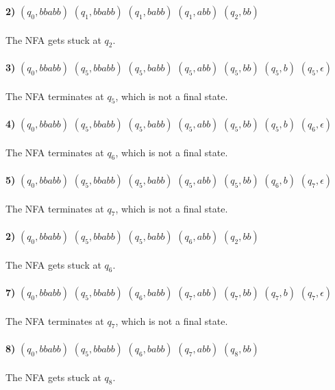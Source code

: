 \documentclass[11pt]{article}
\begin{document}
\textbf{2)} $(q_0,bbabb) $ \vdash $ (q_1,bbabb) $ \vdash $ (q_1,babb) $ \vdash $ (q_1,abb) $ \vdash $ (q_2,bb)$ \\ \\
\indent The NFA gets stuck at $q_2$. \\ \\

\textbf{3)} $(q_0,bbabb) $ \vdash $ (q_5,bbabb) $ \vdash $ (q_5,babb) $ \vdash $ (q_5,abb) $ \vdash $ (q_5,bb) $ \vdash $ (q_5,b) $ \vdash $ (q_5,\epsilon)$ \\ \\
\indent The NFA terminates at $q_5$, which is not a final state. \\ \\

\textbf{4)} $(q_0,bbabb) $ \vdash $ (q_5,bbabb) $ \vdash $ (q_5,babb) $ \vdash $ (q_5,abb) $ \vdash $ (q_5,bb) $ \vdash $ (q_5,b) $ \vdash $ (q_6,\epsilon)$ \\ \\
\indent The NFA terminates at $q_6$, which is not a final state. \\ \\

\textbf{5)} $(q_0,bbabb) $ \vdash $ (q_5,bbabb) $ \vdash $ (q_5,babb) $ \vdash $ (q_5,abb) $ \vdash $ (q_5,bb) $ \vdash $ (q_6,b) $ \vdash $ (q_7,\epsilon)$ \\ \\
\indent The NFA terminates at $q_7$, which is not a final state. \\ \\

\textbf{2)} $(q_0,bbabb) $ \vdash $ (q_5,bbabb) $ \vdash $ (q_5,babb) $ \vdash $ (q_6,abb) $ \vdash $ (q_2,bb)$ \\ \\
\indent The NFA gets stuck at $q_6$. \\ \\

\textbf{7)} $(q_0,bbabb) $ \vdash $ (q_5,bbabb) $ \vdash $ (q_6,babb) $ \vdash $ (q_7,abb) $ \vdash $ (q_7,bb) $ \vdash $ (q_7,b) $ \vdash $ (q_7,\epsilon)$ \\ \\
\indent The NFA terminates at $q_7$, which is not a final state. \\ \\

\textbf{8)} $(q_0,bbabb) $ \vdash $ (q_5,bbabb) $ \vdash $ (q_6,babb) $ \vdash $ (q_7,abb) $ \vdash $ (q_8,bb)$ \\ \\
\indent The NFA gets stuck at $q_8$. \\ \\
\end{document}
